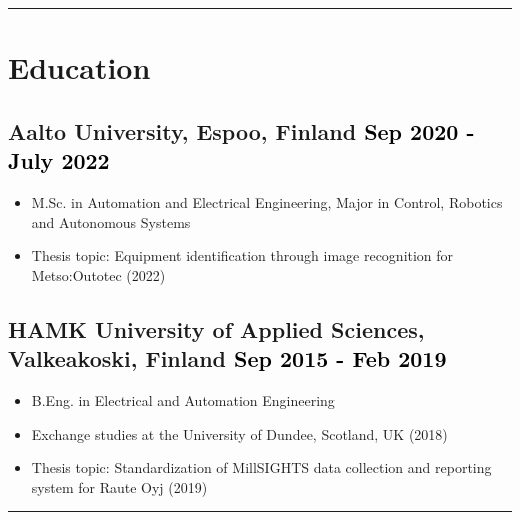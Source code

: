 \documentclass[a4paper,10pt]{article}
\begin{document}
\vspace{0.2cm}
\hrule
\vspace{0.1cm}

\section*{Education}
\subsection*{Aalto University, Espoo, Finland \hfill \textcolor{black}{Sep 2020 - July 2022}}
\begin{itemize}
    \item M.Sc. in Automation and Electrical Engineering, Major in Control, Robotics and Autonomous Systems
    \item Thesis topic: Equipment identification through image recognition for Metso:Outotec (2022)
\end{itemize}

\subsection*{HAMK University of Applied Sciences, Valkeakoski, Finland \hfill \textcolor{black}{Sep 2015 - Feb 2019}}
\begin{itemize}
    \item B.Eng. in Electrical and Automation Engineering
    \item Exchange studies at the University of Dundee, Scotland, UK (2018)
    \item Thesis topic: Standardization of MillSIGHTS data collection and reporting system for Raute Oyj (2019)
\end{itemize}

\vspace{0.2cm}
\hrule
\vspace{0.1cm}
\end{document}
